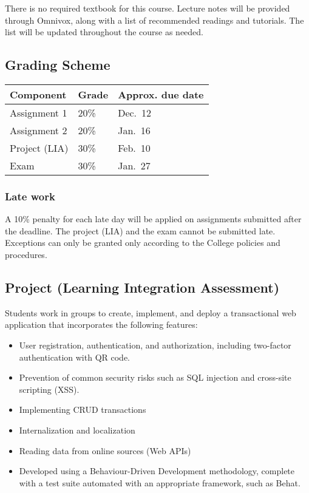 \documentclass[
  10pt,
]{article}
\providecommand{\tightlist}{%
  \setlength{\itemsep}{0pt}\setlength{\parskip}{0pt}}
\begin{document}
There is no required textbook for this course. Lecture notes will be
provided through Omnivox, along with a list of recommended readings and
tutorials. The list will be updated throughout the course as needed.

\hypertarget{grading-scheme}{%
\subsection*{Grading Scheme}\label{grading-scheme}}

\begin{longtable}[]{@{}lll@{}}
\toprule
Component & Grade & Approx. due date\tabularnewline
\midrule
\endhead
Assignment 1 & 20\% & Dec.~12\tabularnewline
Assignment 2 & 20\% & Jan.~16\tabularnewline
Project (LIA) & 30\% & Feb.~10\tabularnewline
Exam & 30\% & Jan.~27\tabularnewline
\bottomrule
\end{longtable}


\hypertarget{late-work}{%
\subsubsection*{Late work}\label{late-work}}

A 10\% penalty for each late day will be applied on assignments
submitted after the deadline. The project (LIA) and the exam cannot be
submitted late. Exceptions can only be granted only according to the
College policies and procedures.

\hypertarget{project-learning-integration-assessment}{%
\subsection*{Project (Learning Integration
Assessment)}\label{project-learning-integration-assessment}}

Students work in groups to create, implement, and deploy a transactional
web application that incorporates the following features:

\begin{itemize}
\tightlist
\item
  User registration, authentication, and authorization, including
  two-factor authentication with QR code.
\item
  Prevention of common security risks such as SQL injection and
  cross-site scripting (XSS).
\item
  Implementing CRUD transactions
\item
  Internalization and localization
\item
  Reading data from online sources (Web APIs)
\item
  Developed using a Behaviour-Driven Development methodology, complete
  with a test suite automated with an appropriate framework, such as
  Behat.
\end{itemize}
\end{document}
